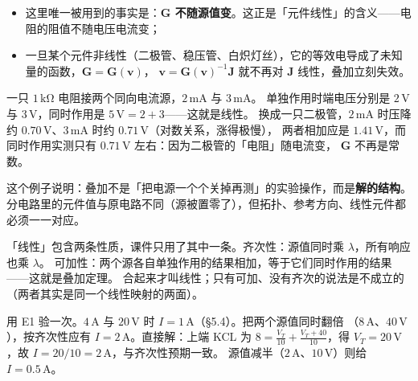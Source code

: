 \documentclass[11pt]{ctexart}
\begin{document}
\begin{itemize}
\item 这里唯一被用到的事实是：\textbf{$\mathbf{G}$ 不随源值变}。这正是「元件线性」的含义——电阻的阻值不随电压电流变；
\item 一旦某个元件非线性（二极管、稳压管、白炽灯丝），它的等效电导成了未知量的函数，$\mathbf{G}=\mathbf{G}(\mathbf{v})$，
      $\mathbf{v}=\mathbf{G}(\mathbf{v})^{-1}\mathbf{J}$ 就不再对 $\mathbf{J}$ 线性，叠加立刻失效。
\end{itemize}





一只 $1\,\mathrm{k\Omega}$ 电阻接两个同向电流源，$2\,\mathrm{mA}$ 与 $3\,\mathrm{mA}$。
单独作用时端电压分别是 $2\,\mathrm{V}$ 与 $3\,\mathrm{V}$，同时作用是 $5\,\mathrm{V}=2+3$——这就是线性。
换成一只二极管，$2\,\mathrm{mA}$ 时压降约 $0.70\,\mathrm{V}$、$3\,\mathrm{mA}$ 时约 $0.71\,\mathrm{V}$（对数关系，涨得极慢），
两者相加应是 $1.41\,\mathrm{V}$，而同时作用实测只有 $0.71\,\mathrm{V}$ 左右：因为二极管的「电阻」随电流变，
$\mathbf{G}$ 不再是常数。

这个例子说明：叠加不是「把电源一个个关掉再测」的实验操作，而是\textbf{解的结构}。
分电路里的元件值与原电路不同（源被置零了），但拓扑、参考方向、线性元件都必须一一对应。


「线性」包含两条性质，课件只用了其中一条。齐次性：源值同时乘 $\lambda$，所有响应也乘 $\lambda$。
可加性：两个源各自单独作用的结果相加，等于它们同时作用的结果——这就是叠加定理。
合起来才叫线性；只有可加、没有齐次的说法是不成立的（两者其实是同一个线性映射的两面）。

用 E1 验一次。$4\,\mathrm{A}$ 与 $20\,\mathrm{V}$ 时 $I=1\,\mathrm{A}$（§5.4）。把两个源值同时翻倍
（$8\,\mathrm{A}$、$40\,\mathrm{V}$），按齐次性应有 $I=2\,\mathrm{A}$。直接解：上端 KCL 为
$8=\frac{V_T}{10}+\frac{V_T+40}{10}$，得 $V_T=20\,\mathrm{V}$，故 $I=20/10=2\,\mathrm{A}$，与齐次性预期一致。
源值减半（$2\,\mathrm{A}$、$10\,\mathrm{V}$）则给 $I=0.5\,\mathrm{A}$。
\end{document}
